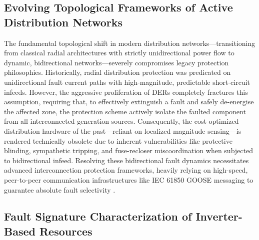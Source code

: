 \subsection{Evolving Topological Frameworks of Active Distribution Networks}

The fundamental topological shift in modern distribution networks—transitioning from classical radial architectures with strictly unidirectional power flow to dynamic, bidirectional networks—severely compromises legacy protection philosophies. Historically, radial distribution protection was predicated on unidirectional fault current paths with high-magnitude, predictable short-circuit infeeds. However, the aggressive proliferation of DERs completely fractures this assumption, requiring that, to effectively extinguish a fault and safely de-energise the affected zone, the protection scheme actively isolate the faulted component from all interconnected generation sources. Consequently, the cost-optimized distribution hardware of the past—reliant on localized magnitude sensing—is rendered technically obsolete due to inherent vulnerabilities like protective blinding, sympathetic tripping, and fuse-recloser miscoordination when subjected to bidirectional infeed. Resolving these bidirectional fault dynamics necessitates advanced interconnection protection frameworks, heavily relying on high-speed, peer-to-peer communication infrastructures like IEC 61850 GOOSE messaging to guarantee absolute fault selectivity \cite{mobashsher2025fault}.


\subsection{Fault Signature Characterization of Inverter-Based Resources}


